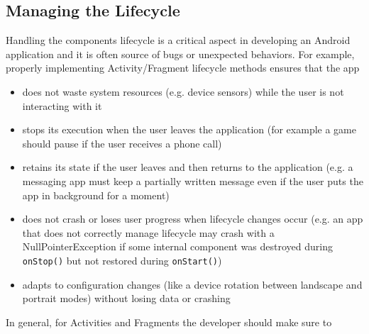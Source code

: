 \documentclass[11pt,a4paper,notitlepage]{article}
\begin{document}
\subsection{Managing the Lifecycle}\label{managing_lifecycle}
Handling the components lifecycle is a critical aspect in developing an Android application and it is often source of bugs or unexpected behaviors. For example, properly implementing Activity/Fragment lifecycle methods ensures that the app
\begin{itemize}
	\item does not waste system resources (e.g. device sensors) while the user is not interacting with it
	\item stops its execution when the user leaves the application (for example a game should pause if the user receives a phone call)
	\item retains its state if the user leaves and then returns to the application (e.g. a messaging app must keep a partially written message even if the user puts the app in background for a moment)
	\item does not crash or loses user progress when lifecycle changes occur (e.g. an app that does not correctly manage lifecycle may crash with a NullPointerException if some internal component was destroyed during \texttt{onStop()} but not restored during \texttt{onStart()})
	\item adapts to configuration changes (like a device rotation between landscape and portrait modes) without losing data or crashing
\end{itemize}
In general, for Activities and Fragments the developer should make sure to
\end{document}
